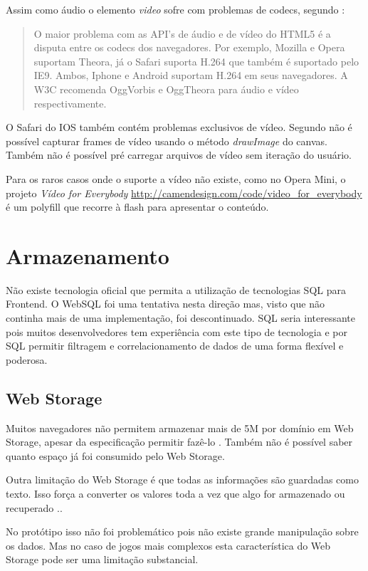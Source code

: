 Assim como áudio o elemento \textit{video} sofre com problemas de
codecs, segundo \citet{html5Tradeoffs}:
\begin{quote}
O maior problema com as API's de áudio e de vídeo do HTML5 é
a disputa entre os codecs dos navegadores. Por exemplo, Mozilla e
Opera suportam Theora, já o Safari suporta H.264 que também é
suportado pelo IE9. Ambos, Iphone e Android suportam H.264 em seus
navegadores. A W3C recomenda OggVorbis e OggTheora para áudio e vídeo
respectivamente.
\end{quote}

O Safari do IOS também contém problemas exclusivos de vídeo. Segundo
\citet{unsolvedMediaHtmlIssues} não é possível capturar frames de
vídeo usando o método \textit{drawImage} do canvas. Também não é
possível pré carregar arquivos de vídeo sem iteração do usuário.

Para os raros casos onde o suporte a vídeo não existe,
como no Opera Mini, o projeto \textit{Vídeo for Everybody}
\url{http://camendesign.com/code/video_for_everybody} é um polyfill que
recorre à flash para apresentar o conteúdo.

\section{Armazenamento}

Não existe tecnologia oficial que permita a utilização de tecnologias
SQL para Frontend. O WebSQL foi uma tentativa nesta direção mas, visto
que não continha mais de uma implementação, foi descontinuado. SQL
seria interessante pois muitos desenvolvedores tem experiência com este
tipo de tecnologia e por SQL permitir filtragem e correlacionamento de
dados de uma forma flexível e poderosa.

\subsection{Web Storage}

Muitos navegadores não permitem armazenar mais de 5M por domínio
em Web Storage, apesar da especificação permitir fazê-lo
\autocite{gameAssetManagement}. Também não é possível saber
quanto espaço já foi consumido pelo Web Storage.

Outra limitação do Web Storage é que todas as informações são
guardadas como texto. Isso força a converter os valores toda a vez que
algo for armazenado ou recuperado \autocite{gameAssetManagement}..

No protótipo isso não foi problemático pois não existe grande
manipulação sobre os dados. Mas no caso de jogos mais complexos esta
característica do Web Storage pode ser uma limitação substancial.

